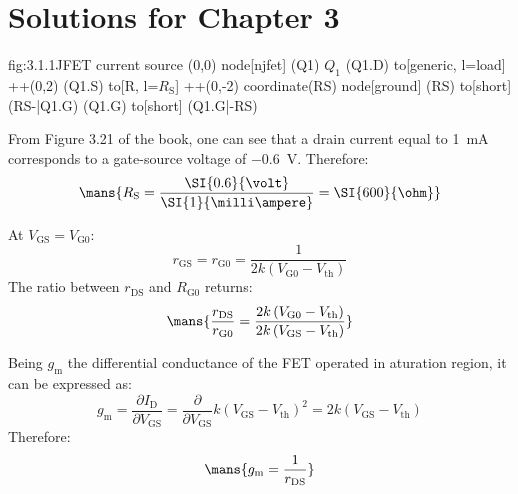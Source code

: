 \chapter{Solutions for Chapter 3}

\begin{circuit}{fig:3.1.1}{JFET current source}
    (0,0) node[njfet] (Q1) {$Q_1$}
    (Q1.D) to[generic, l=load] ++(0,2)
    (Q1.S) to[R, l=$R_\text{S}$] ++(0,-2) coordinate(RS)
    node[ground] {}
    (RS) to[short] (RS-|Q1.G)
    (Q1.G) to[short] (Q1.G|-RS)

\end{circuit}

From Figure 3.21 of the book, one can see that a drain current equal to \SI{1}{\milli\ampere} corresponds to a gate-source voltage of \SI{-0.6}{\volt}.
Therefore:
\[\mans{R_\text{S}=\frac{\SI{0.6}{\volt}}{\SI{1}{\milli\ampere}}=\SI{600}{\ohm}}\]

At $V_\text{GS}=V_\text{G0}$:
\[r_\text{GS}=r_\text{G0}=\frac{1}{2k\left(V_\text{G0}-V_\text{th}\right)}\]
The ratio between $r_\text{DS}$ and $R_\text{G0}$ returns:
\[\mans{\frac{r_\text{DS}}{r_\text{G0}}=\frac{2k\left(V_\text{G0}-V_\text{th}\right)}{2k\left(V_\text{GS}-V_\text{th}\right)}}\]

Being $g_\text{m}$ the differential conductance of the FET operated in aturation region, it can be expressed as:
\[g_\text{m}=\frac{\partial I_\text{D}}{\partial V_\text{GS}}=\frac{\partial}{\partial V_\text{GS}}k\left(V_\text{GS}-V_\text{th}\right)^2=2k\left(V_\text{GS}-V_\text{th}\right)\]
Therefore:
\[\mans{g_\text{m}=\frac{1}{r_\text{DS}}}\]
